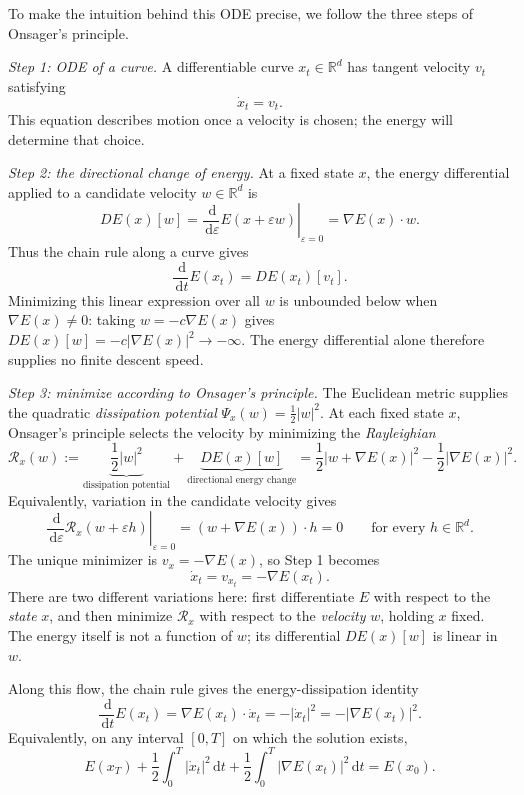 \documentclass[11pt]{amsart}
\numberwithin{equation}{section}
\theoremstyle{plain}
\newcommand{\R}{\mathbb{R}}
\newcommand{\dd}{\,\mathrm{d}}
\newcommand{\abs}[1]{\left\lvert#1\right\rvert}
\begin{document}
To make the intuition behind this ODE precise, we follow the three steps of Onsager's principle. 

\emph{Step 1: ODE of a curve.}
A differentiable curve $x_t\in\R^d$ has tangent velocity $v_t$ satisfying
\[
 \dot x_t=v_t.
\]
This equation describes motion once a velocity is chosen; the energy will
determine that choice.

\emph{Step 2: the directional change of energy.}
At a fixed state $x$, the energy differential applied to a candidate velocity
$w\in\R^d$ is
\[
 DE(x)[w]
 =\left.\frac{\dd}{\dd\varepsilon}E(x+\varepsilon w)
   \right|_{\varepsilon=0}
 =\nabla E(x)\cdot w.
\]
Thus the chain rule along a curve gives
$$\frac{\dd}{\dd t}E(x_t)=DE(x_t)[v_t].
$$
  Minimizing this linear expression
over all $w$ is unbounded below when $\nabla E(x)\neq0$: taking
$w=-c\nabla E(x)$ gives $DE(x)[w]=-c\abs{\nabla E(x)}^2\to-\infty$.
The energy differential alone therefore supplies no finite descent speed.

\emph{Step 3: minimize according to Onsager's principle.}
The Euclidean metric supplies the quadratic \emph{dissipation potential}
$\Psi_x(w)=\frac12\abs w^2$.  At each fixed state $x$, Onsager's principle
selects the velocity by minimizing the \emph{Rayleighian}
\[
 \mathcal R_x(w)
 :=\underbrace{\frac12\abs w^2}_{\text{dissipation potential}}
   +\underbrace{DE(x)[w]}_{\text{directional energy change}}
 =\frac12\abs{w+\nabla E(x)}^2-\frac12\abs{\nabla E(x)}^2.
\]
Equivalently, variation in the candidate velocity gives
\[
 \left.\frac{\dd}{\dd\varepsilon}\mathcal R_x(w+\varepsilon h)
 \right|_{\varepsilon=0}
 =(w+\nabla E(x))\cdot h=0
 \qquad\text{for every }h\in\R^d.
\]
The unique minimizer is $v_x=-\nabla E(x)$, so Step 1 becomes
\begin{equation}\label{eq:euclidean-onsager-flow}
 \dot x_t=v_{x_t}=-\nabla E(x_t).
\end{equation}
There are two different variations here: first differentiate $E$ with respect
to the \emph{state} $x$, and then minimize $\mathcal R_x$ with respect to the
\emph{velocity} $w$, holding $x$ fixed.  The energy itself is not a function
of $w$; its differential $DE(x)[w]$ is linear in $w$.

Along this flow, the chain rule gives the energy-dissipation identity
\[
 \frac{\dd}{\dd t}E(x_t)
 =\nabla E(x_t)\cdot\dot x_t
 =-\abs{\dot x_t}^2=-\abs{\nabla E(x_t)}^2.
\]
Equivalently, on any interval $[0,T]$ on which the solution exists,
\begin{equation}\label{eq:euclidean-energy-dissipation}
 E(x_T)+\frac12\int_0^T\abs{\dot x_t}^2\dd t
       +\frac12\int_0^T\abs{\nabla E(x_t)}^2\dd t=E(x_0).
\end{equation}
\end{document}
